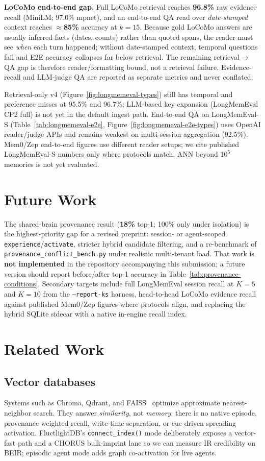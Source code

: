 \documentclass[11pt]{article}
\begin{document}
\textbf{LoCoMo end-to-end gap.} Full LoCoMo retrieval reaches \textbf{96.8\%} raw
evidence recall (MiniLM; 97.0\% mpnet), and an end-to-end QA read over
\emph{date-stamped} context reaches $\approx$\textbf{85\%} accuracy at $k{=}15$.
Because gold LoCoMo answers are usually inferred facts (dates, counts) rather than
quoted spans, the reader must see \emph{when} each turn happened; without
date-stamped context, temporal questions fail and E2E accuracy collapses far below
retrieval. The remaining retrieval$\to$QA gap is therefore reader/formatting
bound, not a retrieval failure. Evidence-recall and LLM-judge QA are reported as
separate metrics and never conflated.

Retrieval-only v4 (Figure~\ref{fig:longmemeval-types}) still has temporal and
preference misses at 95.5\% and 96.7\%; LLM-based key expansion (LongMemEval CP2
full) is not yet in the default ingest path. End-to-end QA on LongMemEval-S
(Table~\ref{tab:longmemeval-e2e}, Figure~\ref{fig:longmemeval-e2e-types}) uses
OpenAI reader/judge APIs and remains weakest on multi-session aggregation (92.5\%).
Mem0/Zep end-to-end figures use different reader setups; we cite published
LongMemEval-S numbers only where protocols match. ANN beyond $10^5$ memories is
not yet evaluated.

\section{Future Work}
\label{sec:future}
The shared-brain provenance result (\textbf{18\%} top-1; 100\% only under isolation) is the highest-priority
gap for a revised preprint: session- or agent-scoped \texttt{experience}/\texttt{activate},
stricter hybrid candidate filtering, and a re-benchmark of
\texttt{provenance\_conflict\_bench.py} under realistic multi-tenant load. That work
is \textbf{not implemented} in the repository accompanying this submission; a future
version should report before/after top-1 accuracy in Table~\ref{tab:provenance-conditions}.
Secondary targets include full LongMemEval session recall at $K{=}5$ and $K{=}10$ from
the \texttt{--report-ks} harness, head-to-head LoCoMo evidence recall against published
Mem0/Zep figures where protocols align, and replacing the hybrid SQLite sidecar with a
native in-engine recall index.

\section{Related Work}
\label{sec:related}
\subsection{Vector databases}
Systems such as Chroma, Qdrant, and FAISS~\cite{thakur2021beir} optimize approximate
nearest-neighbor search. They answer \emph{similarity}, not \emph{memory}: there is
no native episode, provenance-weighted recall, write-time separation, or
cue-driven spreading activation. FluctlightDB's \texttt{connect\_index()} mode
deliberately exposes a vector-fast path and a CHORUS bulk-imprint lane so we can
measure IR credibility on BEIR; episodic agent mode adds graph co-activation for
live agents.
\end{document}
